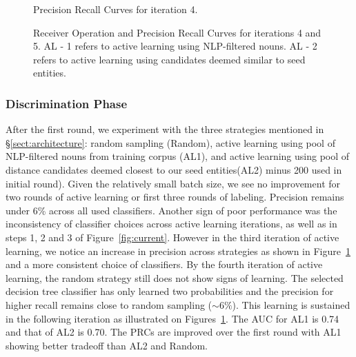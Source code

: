\begin{figure}
\begin{minipage}[b]{.4\textwidth}
\captionsetup{labelformat=empty}
\caption{Precision Recall Curves for iteration 4.}\label{fig:prcs_round5}
\end{minipage}
\setcounter{figure}{8}  
\caption{Receiver Operation and Precision Recall Curves for iterations 4 and 5. AL - 1 refers to active learning using NLP-filtered nouns. AL - 2 refers to active learning using candidates deemed similar to seed entities.}\label{fig:rocs_prcs_round5}
\end{figure}

\subsubsection{Discrimination Phase}
After the first round, we experiment with the three strategies mentioned in \S\ref{sect:architecture}: random sampling (Random), active learning using pool of NLP-filtered nouns from training corpus (AL1), and active learning using pool of  distance candidates deemed closest to our seed entities(AL2) \textemdash minus 200 used in initial round).
Given the relatively small batch size, we see no improvement for two rounds of active learning or first three rounds of labeling. 
Precision remains under 6\% across all used classifiers. 
Another sign of poor performance was the inconsistency of classifier choices across active learning iterations, 
as well as in steps 1, 2 and 3 of Figure~\ref{fig:current}.
However in the third iteration of active learning, we notice an increase in precision across strategies as shown in Figure~\ref{fig:rocs_prcs_round5} and a more consistent choice of classifiers.
By the fourth iteration of active learning, the random strategy still does not show signs of learning. 
The selected decision tree classifier has only learned two probabilities and the precision for higher recall remains close to random sampling ($\sim 6\%$).
This learning is sustained in the following iteration as illustrated on Figures~\ref{fig:rocs_prcs_round5}. 
The AUC for AL1 is 0.74 and that of AL2 is 0.70. The PRCs are improved over the first round with AL1 showing better tradeoff than AL2 and Random.\\


